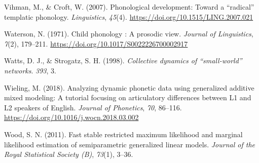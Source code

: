 \documentclass[
  man]{apa6}
\newlength{\cslhangindent}
\newlength{\cslentryspacingunit} %
\newenvironment{CSLReferences}[2] %
 {%
  \setlength{\parindent}{0pt}
  \ifodd #1
  \let\oldpar\par
  \def\par{\hangindent=\cslhangindent\oldpar}
  \fi
  \setlength{\parskip}{#2\cslentryspacingunit}
 }%
 {}
\begin{document}
\begin{CSLReferences}{1}{0}
\leavevmode{}%
Vihman, M., \& Croft, W. (2007). Phonological development: Toward a {``radical''} templatic phonology. \emph{Linguistics}, \emph{45}(4). \url{https://doi.org/10.1515/LING.2007.021}

\leavevmode{}%
Waterson, N. (1971). Child phonology : A prosodic view. \emph{Journal of Linguistics}, \emph{7}(2), 179--211. \url{https://doi.org/10.1017/S0022226700002917}

\leavevmode{}%
Watts, D. J., \& Strogatz, S. H. (1998). \emph{Collective dynamics of {``small-world''} networks}. \emph{393}, 3.

\leavevmode{}%
Wieling, M. (2018). Analyzing dynamic phonetic data using generalized additive mixed modeling: {A} tutorial focusing on articulatory differences between {L1} and {L2} speakers of {English}. \emph{Journal of Phonetics}, \emph{70}, 86--116. \url{https://doi.org/10.1016/j.wocn.2018.03.002}

\leavevmode{}%
Wood, S. N. (2011). Fast stable restricted maximum likelihood and marginal likelihood estimation of semiparametric generalized linear models. \emph{Journal of the Royal Statistical Society (B)}, \emph{73}(1), 3--36.

\end{CSLReferences}


\clearpage
\renewcommand{\listfigurename}{Figure captions}
\end{document}
